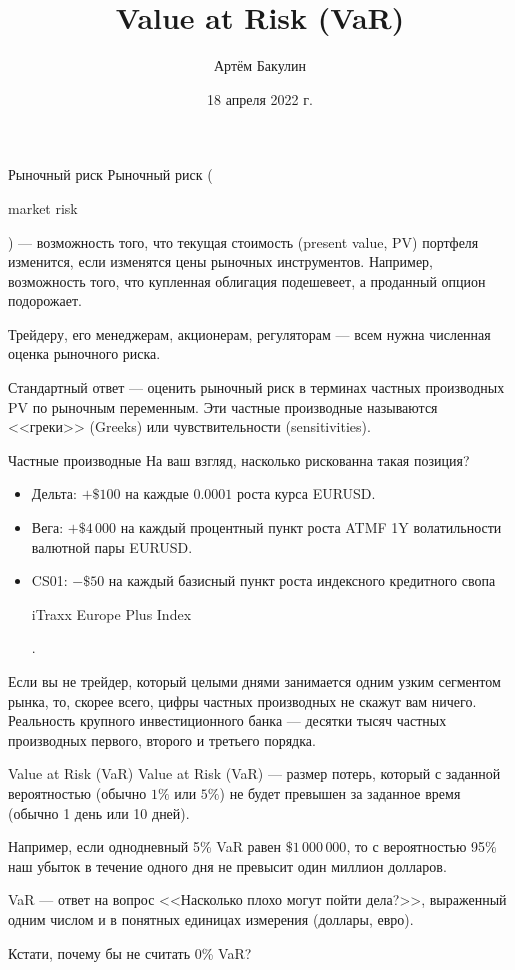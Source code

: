 \documentclass{beamer}
\title{Value at Risk (VaR)}
\author{Артём Бакулин}
\date{18 апреля 2022 г.}
\newcommand{\en}[1]{\begin{otherlanguage}{english}#1\end{otherlanguage}}
\begin{document}
\begin{frame}
\titlepage
\end{frame}



\begin{frame}{Рыночный риск}
\justify
\alert{Рыночный риск} (\en{market risk}) --- возможность того, что текущая стоимость (present value, PV)  
портфеля изменится, если изменятся цены рыночных инструментов. Например, возможность 
того, что купленная облигация подешевеет, а проданный опцион подорожает.

\justify
Трейдеру, его менеджерам, акционерам, регуляторам --- всем нужна численная оценка 
рыночного риска.

\justify
Стандартный ответ  --- оценить рыночный риск в 
терминах частных производных PV по рыночным переменным. Эти частные производные 
называются <<греки>> (Greeks) или чувствительности (sensitivities).
\end{frame}



\begin{frame}{Частные производные}
\justifying
На ваш взгляд, насколько рискованна такая позиция?
\begin{itemize}
\justifying
\item Дельта:  $+\$100$ на каждые $0.0001$ роста курса EURUSD.
\item Вега: $+\$4\,000$ на каждый процентный пункт роста ATMF 1Y волатильности валютной пары EURUSD.
\item CS01: $-\$50$ на каждый базисный пункт роста индексного кредитного свопа \en{iTraxx Europe Plus Index}.
\end{itemize}

\justify
Если вы не трейдер, который целыми днями занимается одним узким сегментом рынка, то, скорее всего, цифры частных производных не скажут вам ничего. Реальность крупного инвестиционного банка --- десятки тысяч частных производных первого, второго и третьего порядка.
\end{frame}



\begin{frame}{Value at Risk (VaR)}
\justify
\alert{Value at Risk (VaR)} --- размер потерь, который с заданной вероятностью (обычно $1\%$ или $5\%$) не будет превышен за заданное время (обычно 1 день или 10 дней). 

\justify
Например, если однодневный 5\% VaR равен $\$1\,000\,000$, то с вероятностью 95\% наш убыток в течение одного дня не превысит один миллион долларов.

\justify
VaR --- ответ на вопрос <<Насколько плохо могут пойти дела?>>, выраженный одним числом и в понятных единицах измерения (доллары, евро).

\justify
Кстати, почему бы не считать 0\% VaR?
\end{frame}
\end{document}
